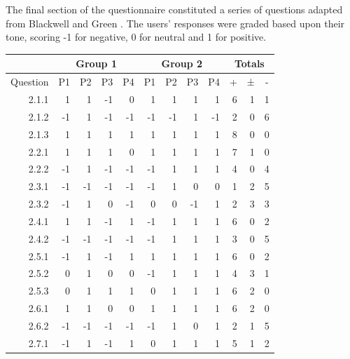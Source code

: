\documentclass[12pt,twoside,notitlepage,xetex]{report}
\begin{document}
{The final section of the questionnaire constituted a series of questions adapted from Blackwell and Green \cite{Blackwell2000}.  The users' responses were graded based upon their tone, scoring -1 for negative, 0 for neutral and 1 for positive.

\begin{center}
\begin{table}[H]
\begin{center}
\begin{tabular}{|r||r|r|r|r||r|r|r|r||r|r|r|}
\cline{2-12}
\multicolumn{1}{c}{} & \multicolumn{4}{|c|}{Group 1} & \multicolumn{4}{c||}{Group 2} & \multicolumn{3}{c|}{Totals}\\ \hline
\multicolumn{1}{|c||}{Question} & \multicolumn{1}{c|}{P1} & \multicolumn{1}{c|}{P2} & \multicolumn{1}{c|}{P3} & \multicolumn{1}{c||}{P4} & \multicolumn{1}{c|}{P1} & \multicolumn{1}{c|}{P2} & \multicolumn{1}{c|}{P3} & \multicolumn{1}{c||}{P4} & \multicolumn{1}{c|}{+} & \multicolumn{1}{c|}{±} & \multicolumn{1}{c|}{-}\\ \hline \hline
2.1.1 & 1 & 1 & -1 & 0 & 1 & 1 & 1 & 1 & 6 & 1 & 1\\ \hline
2.1.2 & -1 & 1 & -1 & -1 & -1 & -1 & 1 & -1 & 2 & 0 & 6\\ \hline
2.1.3 & 1 & 1 & 1 & 1 & 1 & 1 & 1 & 1 & 8 & 0 & 0\\ \hline
2.2.1 & 1 & 1 & 1 & 0 & 1 & 1 & 1 & 1 & 7 & 1 & 0\\ \hline
2.2.2 & -1 & 1 & -1 & -1 & -1 & 1 & 1 & 1 & 4 & 0 & 4\\ \hline
2.3.1 & -1 & -1 & -1 & -1 & -1 & 1 & 0 & 0 & 1 & 2 & 5\\ \hline
2.3.2 & -1 & 1 & 0 & -1 & 0 & 0 & -1 & 1 & 2 & 3 & 3\\ \hline
2.4.1 & 1 & 1 & -1 & 1 & -1 & 1 & 1 & 1 & 6 & 0 & 2\\ \hline
2.4.2 & -1 & -1 & -1 & -1 & -1 & 1 & 1 & 1 & 3 & 0 & 5\\ \hline
2.5.1 & -1 & 1 & -1 & 1 & 1 & 1 & 1 & 1 & 6 & 0 & 2\\ \hline
2.5.2 & 0 & 1 & 0 & 0 & -1 & 1 & 1 & 1 & 4 & 3 & 1\\ \hline
2.5.3 & 0 & 1 & 1 & 1 & 0 & 1 & 1 & 1 & 6 & 2 & 0\\ \hline
2.6.1 & 1 & 1 & 0 & 0 & 1 & 1 & 1 & 1 & 6 & 2 & 0\\ \hline
2.6.2 & -1 & -1 & -1 & -1 & -1 & 1 & 0 & 1 & 2 & 1 & 5\\ \hline
2.7.1 & -1 & 1 & -1 & 1 & 0 & 1 & 1 & 1 & 5 & 1 & 2\\ \hline

\end{tabular}
\end{center}
\end{table}
\end{center}}
\end{document}
